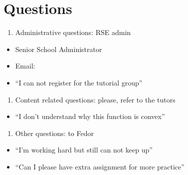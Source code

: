 \documentclass[letterpaper,10pt,english]{jupyterBook}
\begin{document}
\section{Questions}
\label{\detokenize{01.introduction:questions}}\begin{enumerate}
%
\item {} 
\sphinxAtStartPar
Administrative questions: RSE admin

\end{enumerate}
\begin{itemize}
\item {} 
\sphinxAtStartPar
{} Senior School Administrator

\item {} 
\sphinxAtStartPar
Email: 

\item {} 
\sphinxAtStartPar
“I can not register for the tutorial group”

\end{itemize}
\begin{enumerate}
%
\setcounter{enumi}{1}
\item {} 
\sphinxAtStartPar
Content related questions: please, refer to the tutors

\end{enumerate}
\begin{itemize}
\item {} 
\sphinxAtStartPar
“I don’t understand why this function is convex”

\end{itemize}
\begin{enumerate}
%
\setcounter{enumi}{2}
\item {} 
\sphinxAtStartPar
Other questions: to Fedor

\end{enumerate}
\begin{itemize}
\item {} 
\sphinxAtStartPar
“I’m working hard but still can not keep up”

\item {} 
\sphinxAtStartPar
“Can I please have extra assignment for more practice”

\end{itemize}
\end{document}
